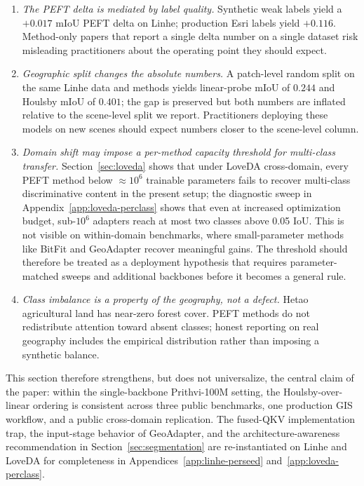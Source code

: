 \documentclass[11pt]{article}
\begin{document}
\begin{enumerate}[leftmargin=1.5em,itemsep=0.2em]
    \item \emph{The PEFT delta is mediated by label quality.} Synthetic weak labels yield a $+0.017$ mIoU PEFT delta on Linhe; production Esri labels yield $+0.116$. Method-only papers that report a single delta number on a single dataset risk misleading practitioners about the operating point they should expect.
    \item \emph{Geographic split changes the absolute numbers.} A patch-level random split on the same Linhe data and methods yields linear-probe mIoU of $0.244$ and Houlsby mIoU of $0.401$; the gap is preserved but both numbers are inflated relative to the scene-level split we report. Practitioners deploying these models on new scenes should expect numbers closer to the scene-level column.
    \item \emph{Domain shift may impose a per-method capacity threshold for multi-class transfer.} Section~\ref{sec:loveda} shows that under LoveDA cross-domain, every PEFT method below $\approx$$10^6$ trainable parameters fails to recover multi-class discriminative content in the present setup; the diagnostic sweep in Appendix~\ref{app:loveda-perclass} shows that even at increased optimization budget, sub-$10^6$ adapters reach at most two classes above 0.05 IoU. This is not visible on within-domain benchmarks, where small-parameter methods like BitFit and GeoAdapter recover meaningful gains. The threshold should therefore be treated as a deployment hypothesis that requires parameter-matched sweeps and additional backbones before it becomes a general rule.
    \item \emph{Class imbalance is a property of the geography, not a defect.} Hetao agricultural land has near-zero forest cover. PEFT methods do not redistribute attention toward absent classes; honest reporting on real geography includes the empirical distribution rather than imposing a synthetic balance.
\end{enumerate}

This section therefore strengthens, but does not universalize, the central claim of the paper: within the single-backbone Prithvi-100M setting, the Houlsby-over-linear ordering is consistent across three public benchmarks, one production GIS workflow, and a public cross-domain replication. The fused-QKV implementation trap, the input-stage behavior of GeoAdapter, and the architecture-awareness recommendation in Section~\ref{sec:segmentation} are re-instantiated on Linhe and LoveDA for completeness in Appendices~\ref{app:linhe-perseed} and~\ref{app:loveda-perclass}.
\end{document}
